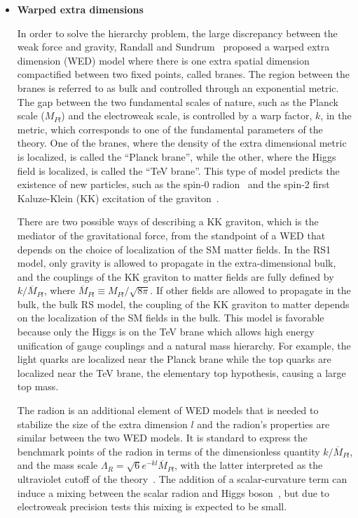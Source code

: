 \begin{itemize}[wide, labelwidth=!, labelindent=0pt]
\setlength{\itemindent}{-.9em}
\item[ ]
\textbf{Warped extra dimensions}

\indent
In order to solve the hierarchy problem, the large discrepancy between the weak force and gravity, Randall and Sundrum~\cite{RS} proposed a warped extra dimension (WED) model where there is one extra spatial dimension compactified between two fixed points, called branes. The region between the branes is referred to as bulk and controlled through an exponential metric. The gap between the two fundamental scales of nature, such as the Planck scale ($M_{Pl}$) and the electroweak scale, is controlled by a warp factor, $k$, in the metric, which corresponds to one of the fundamental parameters of the theory. One of the branes, where the density of the extra dimensional metric is localized, is called the ``Planck brane'', while the other, where the Higgs field is localized, is called the ``TeV brane''. This type of model predicts the existence of new particles, such as the spin-0 radion~\cite{Radion, Radion2, Radion3} and the spin-2 first Kaluze-Klein (KK) excitation of the graviton~\cite{Graviton, Graviton2, Graviton3}. 

There are two possible ways of describing a KK graviton, which is the mediator of the gravitational force, from the standpoint of a WED that depends on the choice of localization of the SM matter fields. In the RS1 model, only gravity is allowed to propagate in the extra-dimensional bulk, and the couplings of the KK graviton to matter fields are fully defined by $k/\overline{M}_{Pl}$, where $\overline{M}_{Pl}\equiv M_{Pl}/\sqrt{8\pi}$. If other fields are allowed to propagate in the bulk, the bulk RS model, the coupling of the KK graviton to matter depends on the localization of the SM fields in the bulk. This model is favorable because only the Higgs is on the TeV brane which allows high energy unification of gauge couplings and a natural mass hierarchy. For example, the light quarks are localized near the Planck brane while the top quarks are localized near the TeV brane, the elementary top hypothesis, causing a large top mass.

The radion is an additional element of WED models that is needed to stabilize the size of the extra dimension $l$ and the radion's properties are similar between the two WED models. It is standard to express the benchmark points of the radion in terms of the dimensionless quantity $k/\overline{M}_{Pl}$, and the mass scale $\Lambda_{R} = \sqrt{6} e^{-kl}\overline{M}_{Pl}$, with the latter interpreted as the ultraviolet cutoff of the theory~\cite{WEDuvCutoff}. The addition of a scalar-curvature term can induce a mixing between the scalar radion and Higgs boson~\cite{RadionHMixing}, but due to electroweak precision tests this mixing is expected to be small.


\end{itemize}
